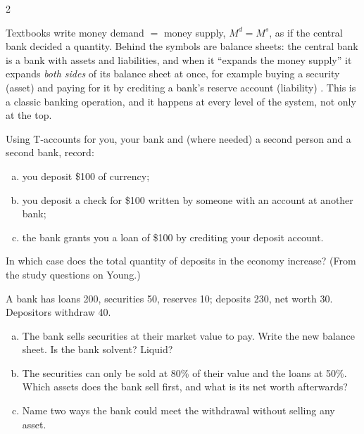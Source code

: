 \begin{paracol}{2}
\begin{intuition}
Textbooks write money demand $=$ money supply, $M^d=M^s$, as if the central bank decided a quantity. Behind the
symbols are balance sheets: the central bank is a bank with assets and liabilities, and when it ``expands the money
supply'' it expands \emph{both sides} of its balance sheet at once, for example buying a security (asset) and paying
for it by crediting a bank's reserve account (liability) . This is a classic banking
operation, and it happens at every level of the system, not only at the top.
\end{intuition}

\begin{taccts}
\qquad
{}
\end{taccts}

\begin{exercise}\label{ex:fp-deposits}
Using T-accounts for you, your bank and (where needed) a second person and a second bank, record:
\begin{enumerate}[(a)]
  \item you deposit \$100 of currency;
  \item you deposit a check for \$100 written by someone with an account at another bank;
  \item the bank grants you a loan of \$100 by crediting your deposit account.
\end{enumerate}
In which case does the total quantity of deposits in the economy increase? (From the study questions on Young.)
\end{exercise}

\begin{exercise}
A bank has loans 200, securities 50, reserves 10; deposits 230, net worth 30. Depositors withdraw 40.
\begin{enumerate}[(a)]
  \item The bank sells securities at their market value to pay. Write the new balance sheet. Is the bank solvent?
        Liquid?
  \item The securities can only be sold at 80\% of their value and the loans at 50\%. Which assets does the bank sell
        first, and what is its net worth afterwards?
  \item Name two ways the bank could meet the withdrawal without selling any asset.
\end{enumerate}
\end{exercise}


\end{paracol}
